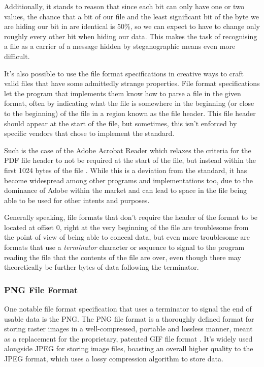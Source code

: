 Additionally, it stands to reason that since each bit can only have one or two values, the chance that a bit of our file 
and the least significant bit of the byte we are hiding our bit in are identical is 50\%, so we can expect to have to
change only roughly every other bit when hiding our data. This makes the task of recognising a file as a carrier of a
message hidden by steganographic means even more difficult.

It's also possible to use the file format specifications in creative ways to craft valid files that have some admittedly
strange properties. File format specifications let the program that implements them know how to parse 
a file in the given format, often by indicating what the file is somewhere in the beginning (or close to the beginning)
of the file in a region known as the file header. This file header should appear at the start of the file, but
sometimes, this isn't enforced by specific vendors that chose to implement the standard. 

Such is the case of the Adobe Acrobat Reader which relaxes the criteria for the \acrfull{PDF} file header to not be
required at the start of the file, but instead within the first 1024 bytes of the file \cite{adobe-acrobat-pdf}. 
While this is a deviation from the standard, it has become widespread among other programs and implementations too, 
due to the dominance of Adobe within the market and can lead to space in the file being able to be used for other 
intents and purposes.

Generally speaking, file formats that don't require the header of the format to be located at offset 0, right at the
very beginning of the file are troublesome from the point of view of being able to conceal data, but even more 
troublesome are formats that use a \emph{terminator} character or sequence to signal to the program reading the file 
that the contents of the file are over, even though there may theoretically be further bytes of data following the 
terminator.

\subsubsection{\acrfull{PNG} File Format}

One notable file format specification that uses a terminator to signal the end of usable data is the \acrfull{PNG}.
The \acrshort{PNG} file format is a thoroughly defined format for storing raster images in a well-compressed, portable
and lossless manner, meant as a replacement for the proprietary, patented \acrfull{GIF} file format \cite{png-standard}.
It's widely used alongside \acrshort{JPEG} for storing image files, boasting an overall higher quality to the
\acrshort{JPEG} format, which uses a lossy compression algorithm to store data. %

